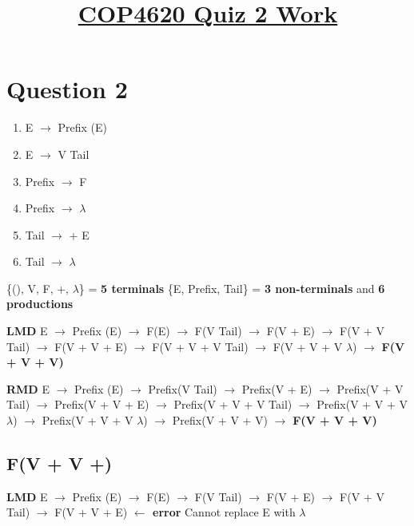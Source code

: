 \documentclass{article}
\title{\vspace{-50pt}\textbf{\underline{COP4620 Quiz 2 Work}}}
\author{}
\date{}
\begin{document}
\maketitle
\vspace{-60pt}

\section*{Question 2}
\vspace{-1em}
  \begin{enumerate}
    \setlength\itemsep{-.25em}
    \renewcommand{\labelenumii}{\arabic{enumii}.}
    \item E $\rightarrow$ Prefix (E)
    \item E $\rightarrow$ V Tail
    \item Prefix $\rightarrow$ F
    \item Prefix $\rightarrow$ $\lambda$
    \item Tail $\rightarrow$ + E
    \item Tail $\rightarrow$ $\lambda$
  \end{enumerate}
\vspace{-1em}
\setlength{\leftskip}{1em}
\noindent\{(), V, F, +, $\lambda$\} = \textbf{5 terminals} \{E, Prefix, Tail\} = \textbf{3 non-terminals} and \textbf{6 productions}

\noindent\textbf{LMD}\newline
E $\rightarrow$ Prefix (E) $\rightarrow$ F(E) $\rightarrow$ F(V Tail) $\rightarrow$ F(V + E)
$\rightarrow$ F(V + V Tail) $\rightarrow$ F(V + V + E)\newline
\indent\hspace{-.2cm}$\rightarrow$ F(V + V + V Tail) $\rightarrow$ F(V + V + V $\lambda$)
$\rightarrow$ \textbf{F(V + V + V)}

\noindent\textbf{RMD}\newline
E $\rightarrow$ Prefix (E) $\rightarrow$ Prefix(V Tail) $\rightarrow$ Prefix(V + E)
$\rightarrow$ Prefix(V + V Tail) $\rightarrow$ Prefix(V + V + E)\newline
\indent\hspace{-.2cm}$\rightarrow$ Prefix(V + V + V Tail) $\rightarrow$ Prefix(V + V + V $\lambda$)
$\rightarrow$ Prefix(V + V + V $\lambda$)\newline
\indent\hspace{-.2cm}$\rightarrow$ Prefix(V + V + V) $\rightarrow$ \textbf{F(V + V + V)}
\vspace{-1em}
\subsection*{F(V + V +)}
\vspace{-.5em}
\noindent\textbf{LMD}\newline
E $\rightarrow$ Prefix (E) $\rightarrow$ F(E) $\rightarrow$ F(V Tail) $\rightarrow$ F(V + E)
$\rightarrow$ F(V + V Tail) $\rightarrow$ F(V + V + E) \textbf{$\leftarrow$ error}\newline
Cannot replace E with $\lambda$\newline
\end{document}
